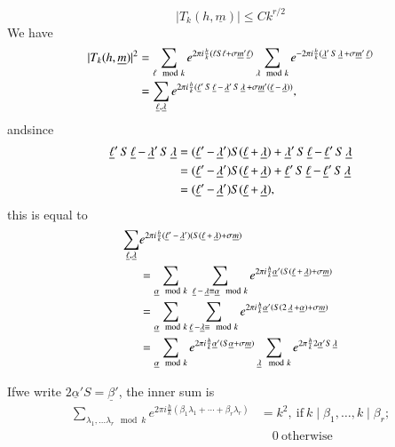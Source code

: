 \begin{lem}\label{part4:lec45:lem2}
  $$
  |T_k (h, \underline{m})| \leq C k^{r/2}
  $$
  We have 
  \begin{align*}
    |T_k (h, \underline{m})|^2 & = \sum_{\ell \mod k} e^{2 \pi i
      \frac{h}{k} (\ell S \ell + \sigma
      \underline{m}' \underline{\ell})} \sum_{\lambda \mod k} e^{- 2
      \pi i \frac{h}{k} (\lm ' S\lm +
      \sigma \underline{m}' \el)}\\
    & = \sum_{\el, \lm } e^{2 \pi i
      \frac{h}{k} (\el' S \el-
      \lm ' S \lm  + \sigma
      \underline{m}' (\el- \lm ))},
  \end{align*}
  and\pageoriginale since
  \begin{align*}
    \el' S \el - \lm' S \lm & = (\el' - \lm') S (\el + \lm) + \lm' S
    \el - \el' S \lm\\
    & = (\el' - \lm') S (\el + \lm) + \el' S \el - \el' S \lm\\
    & = (\el' - \lm') S (\el + \lm),
  \end{align*}
  this is equal to 
  \begin{align*}
    \sum_{\el, \lm} & e^{2 \pi i\frac{h}{k} (\el' - \lm') (S(\el + \lm)+
      \sigma \underline{m})}\\
    & = \sum_{\underline{\alpha} \mod k} ~\sum_{\el - \lm \equiv
      \underline{\alpha} \mod k} e^{2 \pi i \frac{h}{k}
      \underline{\alpha}' (S (\el + \lm) + \sigma \underline{m})}\\
    & = \sum_{\underline{\alpha} \mod k} \sum_{\el
      -\underline{\lambda} \equiv  \mod k} e^{2 \pi i \frac{h}{k}
      \underline{\alpha}' (S (2\lm + \underline{\alpha}) + \sigma
      \underline{m})}\\ 
    & = \sum_{\underline{\alpha} \mod k} e^{2 \pi i \frac{h}{k}
      \underline{\alpha}' (S \underline{\alpha}+ \sigma
      \underline{m})} \sum_{\lm \mod k} e^{2 \pi \frac{h}{k} 2
      \underline{\alpha}' S \lm}
  \end{align*}
\end{lem}

If\pageoriginale we write $2 \underline{\alpha}' S =
\underline{\beta}'$, the inner sum is 
\begin{align*}
\sum_{\lambda_1, \ldots \lambda_r \mod k} e^{2 \pi i \frac{h}{k}
  (\beta_1 \lambda_1 + \cdots + \beta_r \lambda_r)} & = k^2, ~\text{if}~
k\mid \beta_1, \ldots , k\mid\beta_r;\\ 
&\quad  0 ~\text{otherwise}
\end{align*}

